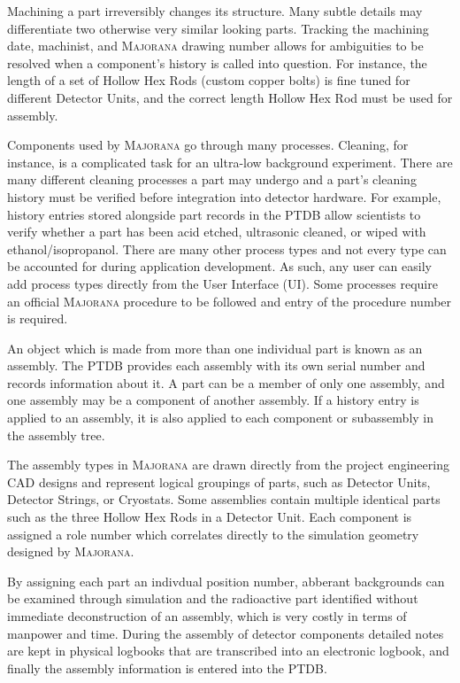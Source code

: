 \documentclass[journal]{IEEEtran}
\begin{document}
Machining a part irreversibly changes its structure. Many subtle details may differentiate
two otherwise very similar looking parts. Tracking the machining date, machinist, and \textsc{Majorana} drawing number allows
for ambiguities to be resolved when a component's history is called into question. 
For instance, the length of a set of Hollow Hex Rods (custom copper bolts) is fine tuned for different Detector Units, and the 
correct length Hollow Hex Rod must be used for assembly.

Components used by \textsc{Majorana} go through many processes. Cleaning, for instance, is a complicated task for an ultra-low
background experiment. There are many different cleaning processes a part may undergo and a part's cleaning history
must be verified before integration into detector hardware. For example, history entries stored alongside part records in the PTDB
allow scientists to verify whether a part has been acid etched, ultrasonic cleaned, or wiped with ethanol/isopropanol.
There are many other process types and not every type can be accounted for during application development. As such, any user can 
easily add process types directly from the User Interface (UI). Some processes require an official \textsc{Majorana} procedure to be
followed and entry of the procedure number is required.

An object which is made from more than one individual
part is known as an assembly. The PTDB provides each assembly with its own serial number and records information about it.
A part can be a member of only one assembly,
and one assembly may be a component of another assembly.
If a history entry is applied to an assembly, it is also applied to each component or sub\-assembly in the assembly tree. 

The assembly types in \textsc{Majorana} are drawn directly from the project engineering CAD designs and represent logical 
groupings of parts, such as Detector Units, Detector Strings, or Cryostats. 
Some assemblies contain multiple identical parts such as the three Hollow Hex Rods in a Detector Unit.
Each component is assigned a role number which correlates directly to the simulation geometry designed by \textsc{Majorana}. 

By assigning each part an indivdual position number, abberant backgrounds can be examined through 
simulation and the radioactive part identified without immediate deconstruction of an assembly, which is very costly in 
terms of manpower and time. During the assembly of detector components detailed notes are kept in physical logbooks that are
transcribed into an electronic logbook, and finally the assembly information is entered into the PTDB.
\end{document}
